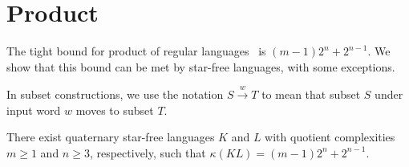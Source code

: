 \documentclass{llncs}
\renewcommand{\ge}{\geqslant}
\begin{document}
\section{Product}
\label{sec:product}


The tight bound for  product of  regular languages~\cite{Mas70,YZS94} is  $(m-1)2^n+2^{n-1}$.
We  show that this bound can be met by star-free languages, with some  exceptions. 

In subset constructions, we use the notation $S\stackrel{w}{\longrightarrow} T$ to mean that subset $S$ under input word $w$ moves to subset $T$.
\begin{theorem}
\label{thm:product}
There exist
quaternary star-free languages $K$ and $L$ with quotient complexities $m\ge 1$ and $n\ge 3$, respectively, such that  $\kappa(KL)=(m-1)2^n+2^{n-1}$.\end{theorem}
\end{document}
